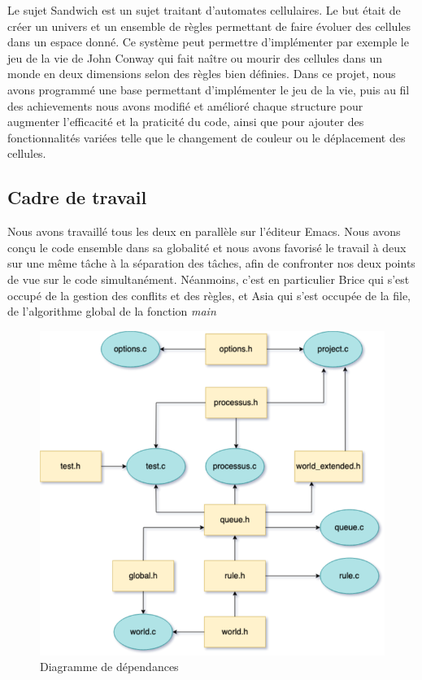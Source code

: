 \documentclass[11pt, a4paper]{article}
\begin{document}
Le sujet Sandwich est un sujet traitant d'automates cellulaires. Le but était de créer un univers et un ensemble de règles permettant de faire évoluer des cellules dans un espace donné. Ce système peut permettre d'implémenter par exemple le jeu de la vie de John Conway qui fait naître ou mourir des cellules dans un monde en deux dimensions selon des règles bien définies.
Dans ce projet, nous avons programmé une base permettant d'implémenter le jeu de la vie, puis au fil des achievements nous avons modifié et amélioré chaque structure pour augmenter l'efficacité et la praticité du code, ainsi que pour ajouter des fonctionnalités variées telle que le changement de couleur ou le déplacement des cellules.

\subsection{Cadre de travail}

Nous avons travaillé tous les deux en parallèle sur l'éditeur Emacs. Nous avons conçu le code ensemble dans sa globalité et nous avons favorisé le travail à deux sur une même tâche à la séparation des tâches, afin de confronter nos deux points de vue sur le code simultanément.  Néanmoins, c'est en particulier Brice qui s'est occupé de la gestion des conflits et des règles, et Asia qui s'est occupée de la file, de l'algorithme global de la fonction \textit{main}
\begin{figure}[!h]
    \centering
    \includegraphics[scale=0.4]{diagramme.png}  
    \caption{Diagramme de dépendances}
    \label{}
\end{figure}
\end{document}
